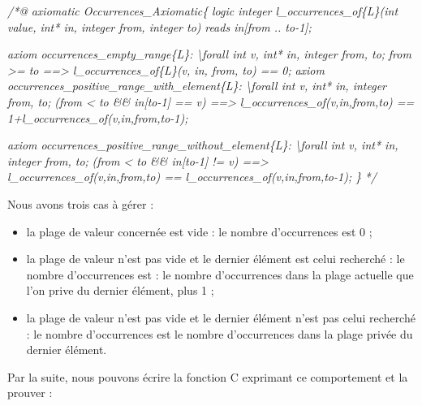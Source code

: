 \documentclass[12pt,francais,]{scrbook}
\newenvironment{Shaded}{}{}
\newcommand{\CommentTok}[1]{\textcolor[rgb]{0.38,0.63,0.69}{\textit{{#1}}}}
\providecommand{\tightlist}{%
  \setlength{\itemsep}{0pt}\setlength{\parskip}{0pt}}
\begin{document}
\begin{footnotesize}\begin{Shaded}
\begin{Highlighting}[]
\CommentTok{/*@}
\CommentTok{  axiomatic Occurrences_Axiomatic\{}
\CommentTok{    logic integer l_occurrences_of\{L\}(int value, int* in, integer from, integer to)}
\CommentTok{      reads in[from .. to-1];}

\CommentTok{    axiom occurrences_empty_range\{L\}:}
\CommentTok{      \textbackslash{}forall int v, int* in, integer from, to;}
\CommentTok{        from >= to ==> l_occurrences_of\{L\}(v, in, from, to) == 0;}
\CommentTok{    }
\CommentTok{    axiom occurrences_positive_range_with_element\{L\}:}
\CommentTok{      \textbackslash{}forall int v, int* in, integer from, to;}
\CommentTok{        (from < to && in[to-1] == v) ==>}
\CommentTok{      l_occurrences_of(v,in,from,to) == 1+l_occurrences_of(v,in,from,to-1);}

\CommentTok{    axiom occurrences_positive_range_without_element\{L\}:}
\CommentTok{      \textbackslash{}forall int v, int* in, integer from, to;}
\CommentTok{        (from < to && in[to-1] != v) ==>}
\CommentTok{      l_occurrences_of(v,in,from,to) == l_occurrences_of(v,in,from,to-1);}
\CommentTok{  \}}
\CommentTok{*/}
\end{Highlighting}
\end{Shaded}\end{footnotesize}

Nous avons trois cas à gérer :

\begin{itemize}
\tightlist
\item
  la plage de valeur concernée est vide : le nombre d'occurrences est 0
  ;
\item
  la plage de valeur n'est pas vide et le dernier élément est celui
  recherché : le nombre d'occurrences est : le nombre d'occurrences dans
  la plage actuelle que l'on prive du dernier élément, plus 1 ;
\item
  la plage de valeur n'est pas vide et le dernier élément n'est pas
  celui recherché : le nombre d'occurrences est le nombre d'occurrences
  dans la plage privée du dernier élément.
\end{itemize}

Par la suite, nous pouvons écrire la fonction C exprimant ce
comportement et la prouver :
\end{document}
